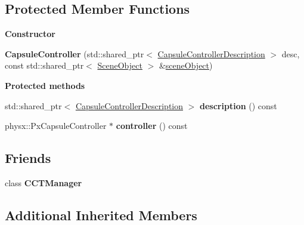 \subsection*{Protected Member Functions}
\begin{Indent}\textbf{ Constructor}\par
\begin{DoxyCompactItemize}
\item 
\mbox{\label{classrev_1_1_capsule_controller_a5a19acaae62761e032eb72bb30b0f928}} 
{\bfseries Capsule\+Controller} (std\+::shared\+\_\+ptr$<$ \mbox{\hyperlink{classrev_1_1_capsule_controller_description}{Capsule\+Controller\+Description}} $>$ desc, const std\+::shared\+\_\+ptr$<$ \mbox{\hyperlink{classrev_1_1_scene_object}{Scene\+Object}} $>$ \&\mbox{\hyperlink{classrev_1_1_character_controller_aafc51e1eb03ebd5f8f86d88b56067a64}{scene\+Object}})
\end{DoxyCompactItemize}
\end{Indent}
\begin{Indent}\textbf{ Protected methods}\par
\begin{DoxyCompactItemize}
\item 
\mbox{\label{classrev_1_1_capsule_controller_a9443b81e25386ecc8c0afbef3eba5a1b}} 
std\+::shared\+\_\+ptr$<$ \mbox{\hyperlink{classrev_1_1_capsule_controller_description}{Capsule\+Controller\+Description}} $>$ {\bfseries description} () const
\item 
\mbox{\label{classrev_1_1_capsule_controller_ad481baa6d4404db63f9f62df3bf71b70}} 
physx\+::\+Px\+Capsule\+Controller $\ast$ {\bfseries controller} () const
\end{DoxyCompactItemize}
\end{Indent}
\subsection*{Friends}
\begin{DoxyCompactItemize}
\item 
\mbox{\label{classrev_1_1_capsule_controller_aed3d0fdf6b78428902946828649415c9}} 
class {\bfseries C\+C\+T\+Manager}
\end{DoxyCompactItemize}
\subsection*{Additional Inherited Members}


